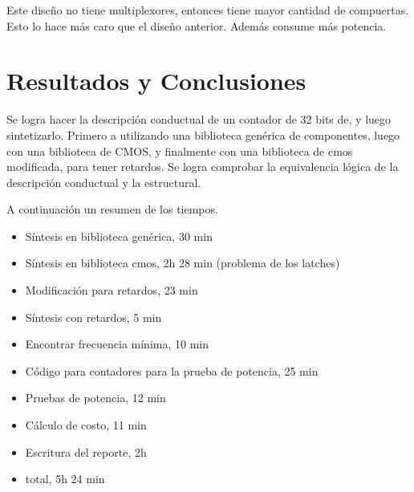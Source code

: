 \documentclass {article}
\begin{document}
Este diseño no tiene multiplexores, entonces tiene mayor cantidad de compuertas. Esto lo hace más caro que el diseño anterior. Además consume más potencia. 

\section{Resultados y Conclusiones}

Se logra hacer la descripción conductual de un contador de 32 bits de, y luego sintetizarlo. Primero a utilizando una biblioteca genérica de componentes, luego con una biblioteca de CMOS, y finalmente con una biblioteca de cmos modificada, para tener retardos. Se logra comprobar la equivalencia lógica de la descripción conductual y la estructural. 

A continuación un resumen de los tiempos.

\begin{itemize}
\item Síntesis en biblioteca genérica, 30 min
\item Síntesis en biblioteca cmos, 2h 28 min (problema de los latches)
\item Modificación para retardos, 23 min
\item Síntesis con retardos, 5 min
\item Encontrar frecuencia mínima, 10 min
\item Código para contadores para la prueba de potencia, 25 min
\item Pruebas de potencia, 12 min
\item Cálculo de costo, 11 min
\item Escritura del reporte, 2h
\item total, 5h 24 min
\end{itemize} 


\end{document}
